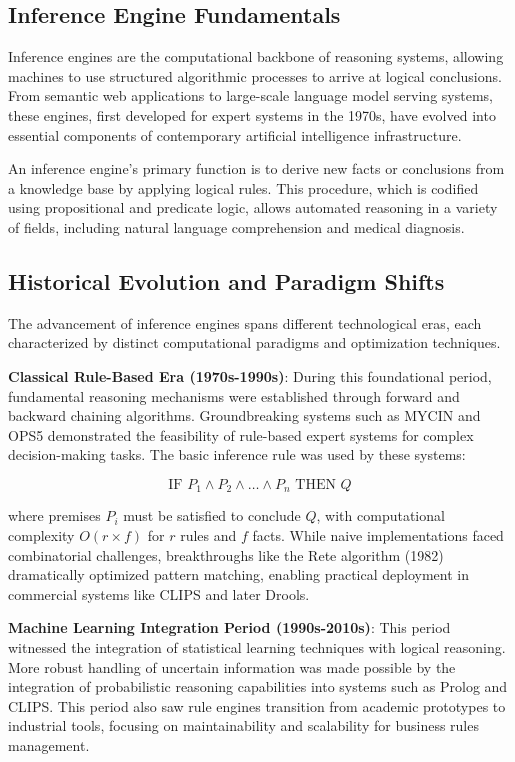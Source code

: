 \documentclass[12pt,a4paper]{article}
\begin{document}
\subsection{Inference Engine Fundamentals}
Inference engines are the computational backbone of reasoning systems, allowing machines to use structured algorithmic processes to arrive at logical conclusions. From semantic web applications to large-scale language model serving systems, these engines, first developed for expert systems in the 1970s, have evolved into essential components of contemporary artificial intelligence infrastructure.

An inference engine's primary function is to derive new facts or conclusions from a knowledge base by applying logical rules. This procedure, which is codified using propositional and predicate logic, allows automated reasoning in a variety of fields, including natural language comprehension and medical diagnosis.

\subsection{Historical Evolution and Paradigm Shifts}
The advancement of inference engines spans different technological eras, each characterized by distinct computational paradigms and optimization techniques.

\textbf{Classical Rule-Based Era (1970s-1990s)}: During this foundational period, fundamental reasoning mechanisms were established through forward and backward chaining algorithms. Groundbreaking systems such as MYCIN and OPS5 demonstrated the feasibility of rule-based expert systems for complex decision-making tasks. The basic inference rule was used by these systems:

\begin{equation}
\text{IF } P_1 \wedge P_2 \wedge \ldots \wedge P_n \text{ THEN } Q
\end{equation}

where premises $P_i$ must be satisfied to conclude $Q$, with computational complexity $O(r \times f)$ for $r$ rules and $f$ facts. While naive implementations faced combinatorial challenges, breakthroughs like the Rete algorithm (1982) dramatically optimized pattern matching, enabling practical deployment in commercial systems like CLIPS and later Drools.

\textbf{Machine Learning Integration Period (1990s-2010s)}: This period witnessed the integration of statistical learning techniques with logical reasoning. More robust handling of uncertain information was made possible by the integration of probabilistic reasoning capabilities into systems such as Prolog and CLIPS. This period also saw rule engines transition from academic prototypes to industrial tools, focusing on maintainability and scalability for business rules management.
\end{document}
